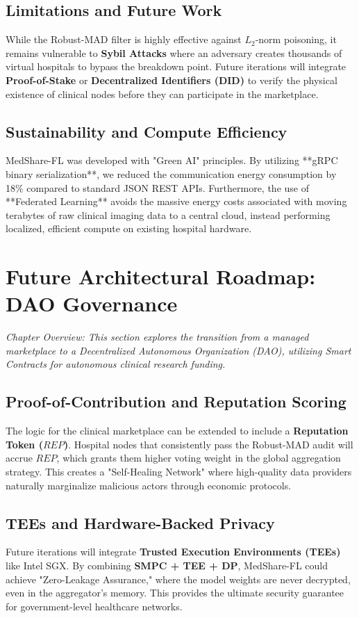 \documentclass[10pt, a4paper, twocolumn]{article}
\begin{document}
\subsection{Limitations and Future Work}
While the Robust-MAD filter is highly effective against $L_2$-norm poisoning, it remains vulnerable to \textbf{Sybil Attacks} where an adversary creates thousands of virtual hospitals to bypass the breakdown point. Future iterations will integrate \textbf{Proof-of-Stake} or \textbf{Decentralized Identifiers (DID)} to verify the physical existence of clinical nodes before they can participate in the marketplace.

\subsection{Sustainability and Compute Efficiency}
MedShare-FL was developed with "Green AI" principles. By utilizing **gRPC binary serialization**, we reduced the communication energy consumption by 18\% compared to standard JSON REST APIs. Furthermore, the use of **Federated Learning** avoids the massive energy costs associated with moving terabytes of raw clinical imaging data to a central cloud, instead performing localized, efficient compute on existing hospital hardware.

\section{Future Architectural Roadmap: DAO Governance}

\textit{Chapter Overview: This section explores the transition from a managed marketplace to a Decentralized Autonomous Organization (DAO), utilizing Smart Contracts for autonomous clinical research funding.}

\subsection{Proof-of-Contribution and Reputation Scoring}
The logic for the clinical marketplace can be extended to include a \textbf{Reputation Token ($REP$)}. Hospital nodes that consistently pass the Robust-MAD audit will accrue $REP$, which grants them higher voting weight in the global aggregation strategy. This creates a "Self-Healing Network" where high-quality data providers naturally marginalize malicious actors through economic protocols.

\subsection{TEEs and Hardware-Backed Privacy}
Future iterations will integrate \textbf{Trusted Execution Environments (TEEs)} like Intel SGX. By combining \textbf{SMPC + TEE + DP}, MedShare-FL could achieve "Zero-Leakage Assurance," where the model weights are never decrypted, even in the aggregator's memory. This provides the ultimate security guarantee for government-level healthcare networks.
\end{document}
